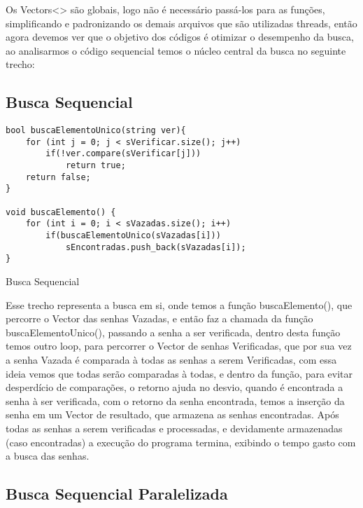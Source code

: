 \documentclass[10pt,journal,compsoc]{IEEEtran}
\begin{document}
Os Vectors<> são globais, logo não é necessário passá-los para as funções, simplificando e padronizando os demais arquivos que são utilizadas threads, então agora devemos ver que o objetivo dos códigos é otimizar o desempenho da busca, ao analisarmos o código sequencial temos o núcleo central da busca no seguinte trecho:

\subsection{Busca Sequencial}
\begin{listing}[ht]
\begin{verbatim}
bool buscaElementoUnico(string ver){
    for (int j = 0; j < sVerificar.size(); j++)
        if(!ver.compare(sVerificar[j]))
            return true;
    return false;
}

void buscaElemento() {
    for (int i = 0; i < sVazadas.size(); i++)
        if(buscaElementoUnico(sVazadas[i]))
            sEncontradas.push_back(sVazadas[i]);
}
\end{verbatim}
\caption{Busca Sequencial}
\label{listing:2}
\end{listing}

Esse trecho representa a busca em si, onde temos a função buscaElemento(), que percorre o Vector das senhas Vazadas, e então faz a chamada da função buscaElementoUnico(), passando a senha a ser verificada, dentro desta função temos outro loop, para percorrer o Vector de senhas Verificadas, que por sua vez a senha Vazada é comparada à todas as senhas a serem Verificadas, com essa ideia vemos que todas serão comparadas à todas, e dentro da função, para evitar desperdício de comparações, o retorno ajuda no desvio, quando é encontrada a senha à ser verificada, com o retorno da senha encontrada, temos a inserção da senha em um Vector de resultado, que armazena as senhas encontradas. Após todas as senhas a serem verificadas e processadas, e devidamente armazenadas (caso encontradas) a execução do programa termina, exibindo o tempo gasto com a busca das senhas.


\subsection{Busca Sequencial Paralelizada}
	
\end{document}
